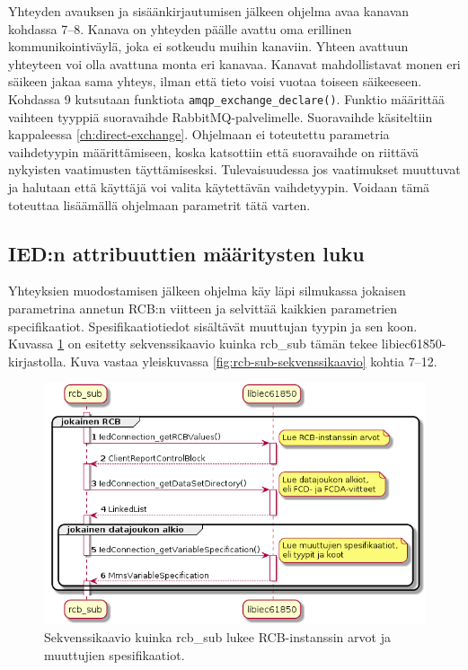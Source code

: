 Yhteyden avauksen ja sisäänkirjautumisen jälkeen ohjelma avaa kanavan kohdassa 7--8. Kanava on yhteyden päälle avattu oma erillinen kommunikointiväylä, joka ei sotkeudu muihin kanaviin. Yhteen avattuun yhteyteen voi olla avattuna monta eri kanavaa. Kanavat mahdollistavat monen eri säikeen jakaa sama yhteys, ilman että tieto voisi vuotaa toiseen säikeeseen. Kohdassa 9 kutsutaan funktiota \texttt{amqp\_exchange\_declare()}. Funktio määrittää vaihteen tyyppiä suoravaihde RabbitMQ-palvelimelle. Suoravaihde käsiteltiin kappaleessa \ref{ch:direct-exchange}. Ohjelmaan ei toteutettu parametria vaihdetyypin määrittämiseen, koska katsottiin että suoravaihde on riittävä nykyisten vaatimusten täyttämisesksi. Tulevaisuudessa jos vaatimukset muuttuvat ja halutaan että käyttäjä voi valita käytettävän vaihdetyypin. Voidaan tämä toteuttaa lisäämällä ohjelmaan parametrit tätä varten.


\subsection{IED:n attribuuttien määritysten luku}
Yhteyksien muodostamisen jälkeen ohjelma käy läpi silmukassa jokaisen parametrina annetun RCB:n viitteen ja selvittää kaikkien parametrien specifikaatiot. Spesifikaatiotiedot sisältävät muuttujan tyypin ja sen koon. Kuvassa \ref{fig:rcb-sub-reading-specifications} on esitetty sekvenssikaavio kuinka rcb\_sub tämän tekee libiec61850-kirjastolla. Kuva vastaa yleiskuvassa \ref{fig:rcb-sub-sekvenssikaavio} kohtia 7--12.

\begin{figure}[ht!]
	\includegraphics[width=1\textwidth]{pictures/rcb-sub-reading-specifications.png}
	\caption{Sekvenssikaavio kuinka rcb\_sub lukee RCB-instanssin arvot ja muuttujien spesifikaatiot.}
	\label{fig:rcb-sub-reading-specifications}
\end{figure}

